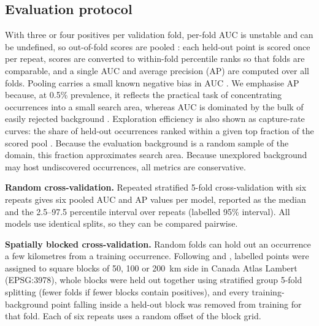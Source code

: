 \documentclass[pdflatex,sn-apa]{sn-jnl}
\begin{document}
\subsection{Evaluation protocol}\label{sec:protocol}

With three or four positives per validation fold, per-fold AUC is unstable and can be undefined, so out-of-fold scores are pooled \citep{BradleyAP1997}: each held-out point is scored once per repeat, scores are converted to within-fold percentile ranks so that folds are comparable, and a single AUC and average precision (AP) are computed over all folds. Pooling carries a small known negative bias in AUC \citep{Airola2019,Parker2007}. We emphasise AP because, at 0.5\% prevalence, it reflects the practical task of concentrating occurrences into a small search area, whereas AUC is dominated by the bulk of easily rejected background \citep{Saito2015}. Exploration efficiency is also shown as capture-rate curves: the share of held-out occurrences ranked within a given top fraction of the scored pool \citep{Chung2003,Agterberg2005}. Because the evaluation background is a random sample of the domain, this fraction approximates search area. Because unexplored background may host undiscovered occurrences, all metrics are conservative.

\textbf{Random cross-validation.} Repeated stratified 5-fold cross-validation with six repeats gives six pooled AUC and AP values per model, reported as the median and the 2.5--97.5 percentile interval over repeats (labelled 95\% interval). All models use identical splits, so they can be compared pairwise.

\textbf{Spatially blocked cross-validation.} Random folds can hold out an occurrence a few kilometres from a training occurrence. Following \citet{Roberts2017} and \citet{Valavi2019}, labelled points were assigned to square blocks of 50, 100 or 200~km side in Canada Atlas Lambert (EPSG:3978), whole blocks were held out together using stratified group 5-fold splitting (fewer folds if fewer blocks contain positives), and every training-background point falling inside a held-out block was removed from training for that fold. Each of six repeats uses a random offset of the block grid.
\end{document}
